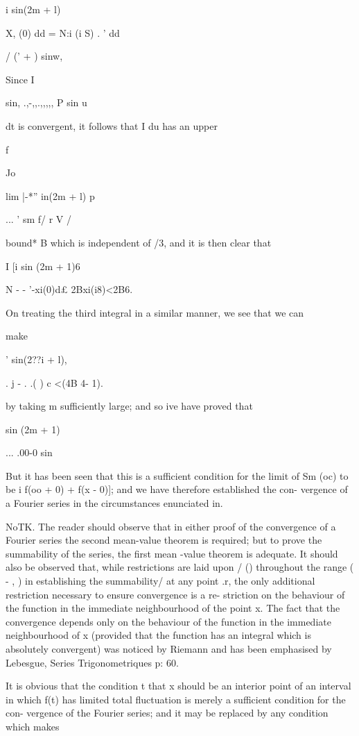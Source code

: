 i sin(2m + l)

X, (0) dd = N:i (i S) . ' dd

  / (' + ) sinw,

Since I

sin, .,-,,.,,,,, P sin u

dt is convergent, it follows that I du has an upper

f

Jo

lim |-*'' in(2m + l) p

... ' sm f/ r V /

bound* B which is independent of /3, and it is then clear that

I [i sin (2m + 1)6

N - - '-xi(0)d£ 2Bxi(i8)<2B6.

On treating the third integral in a similar manner, we see that we can

make

  ' sin(2??i + l),

. j - . .( ) c <(4B 4- 1).

by taking m sufficiently large; and so ive have proved that

sin (2m + 1)

... .00-0 sin

But it has been seen that this is a sufficient condition for the limit
of Sm (oc) to be i f(oo + 0) + f(x - 0)]; and we have therefore
established the con- vergence of a Fourier series in the circumstances
enunciated in.

NoTK. The reader should observe that in either proof of the
convergence of a Fourier series the second mean-value theorem is
required; but to prove the summability of the series, the first mean
-value theorem is adequate. It should also be observed that, while
restrictions are laid upon / () throughout the range ( - \pi, \pi) in
establishing the summability/ at any point .r, the only additional
restriction necessary to ensure convergence is a re- striction on the
behaviour of the function in the immediate neighbourhood of the point
x. The fact that the convergence depends only on the behaviour of the
function in the immediate neighbourhood of x (provided that the
function has an integral which is absolutely convergent) was noticed
by Riemann and has been emphasised by Lebesgue, Series
Trigonometriques p: 60.

It is obvious that the condition t that x should be an interior point
of an interval in which f(t) has limited total fluctuation is merely a
sufficient condition for the con- vergence of the Fourier series; and
it may be replaced by any condition which makes

